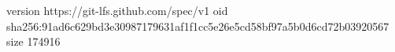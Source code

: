 version https://git-lfs.github.com/spec/v1
oid sha256:91ad6c629bd3e30987179631af1f1cc5e26e5cd58bf97a5b0d6cd72b03920567
size 174916

